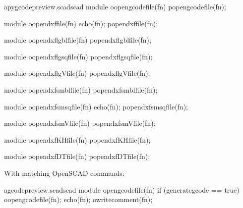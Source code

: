 \documentclass{ltxdoc}
\begin{document}
\lstset{firstnumber=\thepyscad}
\begin{writecode}{a}{pygcodepreview.scad}{scad}
module oopengcodefile(fn) {
    popengcodefile(fn);
}

module oopendxffile(fn) {
    echo(fn);
    popendxffile(fn);
}

module oopendxflgblfile(fn) {
    popendxflgblfile(fn);
}

module oopendxflgsqfile(fn) {
    popendxflgsqfile(fn);
}

module oopendxflgVfile(fn) {
    popendxflgVfile(fn);
}

module oopendxfsmblfile(fn) {
    popendxfsmblfile(fn);
}

module oopendxfsmsqfile(fn) {
    echo(fn);
    popendxfsmsqfile(fn);
}

module oopendxfsmVfile(fn) {
    popendxfsmVfile(fn);
}

module oopendxfKHfile(fn) {
    popendxfKHfile(fn);
}

module oopendxfDTfile(fn) {
    popendxfDTfile(fn);
}

\end{writecode}
\addtocounter{pyscad}{42}

With matching OpenSCAD commands: %
 
\lstset{firstnumber=\thegcpscad}
\begin{writecode}{a}{gcodepreview.scad}{scad}
module opengcodefile(fn) {
if (generategcode == true) {
    oopengcodefile(fn);
    echo(fn);
    owritecomment(fn);
    }
}

\end{writecode}
\addtocounter{gcpscad}{8}
\end{document}
